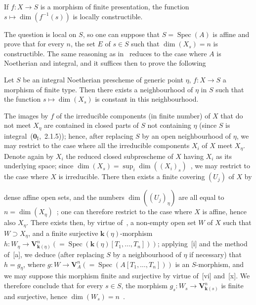 \begin{proposition}[9.2.6.1]
\label{IV.9.2.6.1}
If $f:X\to S$ is a morphism of finite presentation, the function $s\mapsto\dim(f^{-1}(s))$ is locally constructible.
\end{proposition}

The question is local on $S$, so one can suppose that $S=\operatorname{Spec}(A)$ is affine and prove that for every $n$, the set $E$ of $s\in S$ such that $\dim(X_s)=n$ is constructible.
The same reasoning as in~ reduces to the case where $A$ is Noetherian and integral, and it suffices then to prove the following

\begin{corollary}[9.2.6.2]
\label{IV.9.2.6.2}
Let $S$ be an integral Noetherian prescheme of generic point $\eta$, $f:X\to S$ a morphism of finite type.
Then there exists a neighbourhood of $\eta$ in $S$ such that the function $s\mapsto\dim(X_s)$ is constant in this neighbourhood.
\end{corollary}

The images by $f$ of the irreducible components (in finite number) of $X$ that do not meet $X_\eta$ are contained in closed parts of $S$ not containing $\eta$ (since $S$ is integral~($\mathbf{0}_{\mathrm{I}}$,~2.1.5)); hence, after replacing $S$ by an open neighbourhood of $\eta$, we may restrict to the case where all the irreducible components $X_i$ of $X$ meet $X_\eta$.
Denote again by $X_i$ the reduced closed subprescheme of $X$ having $X_i$ as its underlying space; since $\dim(X_s)=\sup_i\dim((X_i)_s)$~, we may restrict to the case where $X$ is irreducible.
There then exists a finite covering $(U_j)$ of $X$ by

dense affine open sets, and the numbers $\dim((U_j)_\eta)$ are all equal to $n=\dim(X_\eta)$~; one can therefore restrict to the case where $X$ is affine, hence also $X_\eta$.
There exists then, by virtue of~, a non-empty open set $W$ of $X$ such that $W\supset X_\eta$, and a finite surjective $\mathbf{k}(\eta)$-morphism $h:W_\eta\to\mathbf{V}_{\mathbf{k}(\eta)}^n(=\operatorname{Spec}(\mathbf{k}(\eta)[T_1,\ldots,T_n]))$; applying~[i] and the method of~[a], we deduce (after replacing $S$ by a neighbourhood of $\eta$ if necessary) that $h=g_\eta$, where $g:W\to\mathbf{V}_A^n(=\operatorname{Spec}(A[T_1,\ldots,T_n]))$ is an $S$-morphism, and we may suppose this morphism finite and surjective by virtue of~[vi] and~[x].
We therefore conclude that for every $s\in S$, the morphism $g_s:W_s\to\mathbf{V}_{\mathbf{k}(s)}^n$ is finite and surjective, hence $\dim(W_s)=n$~.

